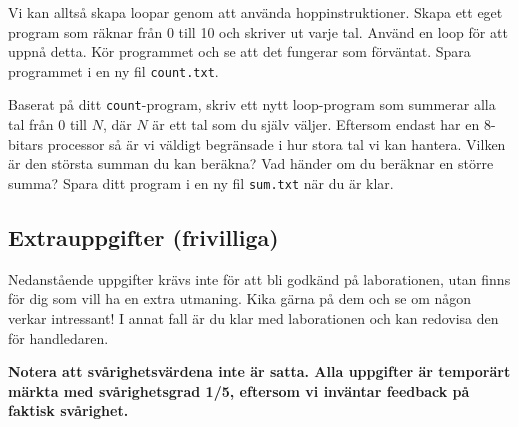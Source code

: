 \begin{Datorarbete}
    \item {} Vi kan alltså skapa loopar genom att använda hoppinstruktioner. Skapa ett eget program som räknar från 0 till 10 och skriver ut varje tal. Använd en loop för att uppnå detta. Kör programmet och se att det fungerar som förväntat. Spara programmet i en ny fil \texttt{count.txt}.
    
    \item {} Baserat på ditt \texttt{count}-program, skriv ett nytt loop-program som summerar alla tal från 0 till \(N\), där \(N\) är ett tal som du själv väljer. Eftersom \progname{} endast har en 8-bitars processor så är vi väldigt begränsade i hur stora tal vi kan hantera. Vilken är den största summan du kan beräkna? Vad händer om du beräknar en större summa? Spara ditt program i en ny fil \texttt{sum.txt} när du är klar.
\end{Datorarbete}


\subsection{Extrauppgifter (frivilliga)}

Nedanstående uppgifter krävs inte för att bli godkänd på laborationen, utan finns för dig som vill ha en extra utmaning. Kika gärna på dem och se om någon verkar intressant! I annat fall är du klar med laborationen och kan redovisa den för handledaren.

\halfblankline
\noindent\textbf{Notera att svårighetsvärdena inte är satta. Alla uppgifter är temporärt märkta med svårighetsgrad 1/5, eftersom vi inväntar feedback på faktisk svårighet.}

